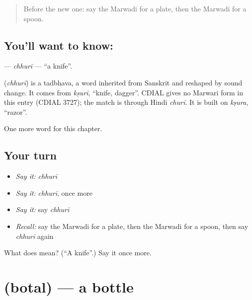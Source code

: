 \label{lesson:MW-C64-chhuri}



\begin{quote}
Before the new one: say the Marwadi for a plate, then the Marwadi for a spoon.
\end{quote}

\subsection*{You'll want to know: }
\textbf{} — \emph{chhurī} — \textquotedblleft{}a knife\textquotedblright{}.

\begin{cousinweb}
\textbf{} (\emph{chhurī}) is a tadbhava, a word inherited from Sanskrit and reshaped by sound change. It comes from \emph{kṣurī}, \textquotedblleft{}knife, dagger\textquotedblright{}. CDIAL gives no Marwari form in this entry (CDIAL 3727); the match is through Hindi \emph{churī}. It is built on \emph{kṣura}, \textquotedblleft{}razor\textquotedblright{}.
\end{cousinweb}

\begin{grammarlens}[title={What you've built}]
One more word for this chapter.
\end{grammarlens}

\subsection*{Your turn}
\begin{itemize}
\raggedright
  \item \emph{Say it:} \emph{chhurī}
  \item \emph{Say it:} \emph{chhurī}, once more
  \item \emph{Say it:} say \emph{chhurī}
  \item \emph{Recall:} say the Marwadi for a plate, then the Marwadi for a spoon, then say \emph{chhurī} again
\end{itemize}

\begin{tcolorbox}[breakable,colback=teal!4,colframe=teal!35!black,title={Before you move on}]
What does  mean? (\textquotedblleft{}A knife\textquotedblright{}.) Say it once more.
\end{tcolorbox}
\section[\texorpdfstring{\mw{बोतल} (botal)}{बोतल (botal)}]{ (botal) — a bottle}

